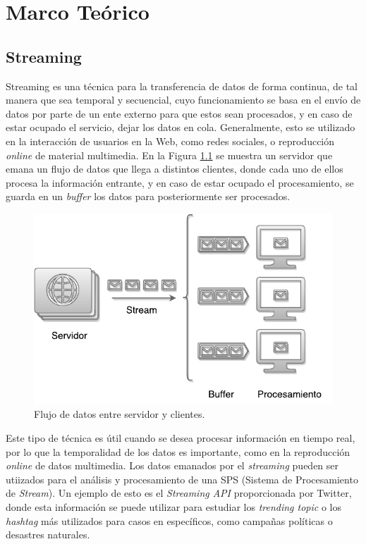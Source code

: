 \chapter{Marco Teórico}
\label{cap:marcoTeorico}

\section{Streaming}

Streaming es una técnica para la transferencia de datos de forma continua, de tal manera que sea temporal y secuencial, cuyo funcionamiento se basa en el envío de datos por parte de un ente externo para que estos sean procesados, y en caso de estar ocupado el servicio, dejar los datos en cola. Generalmente, esto se utilizado en la interacción de usuarios en la Web, como redes sociales, o reproducción \textit{online} de material multimedia. En la Figura \ref{fig:streaming} se muestra un servidor que emana un flujo de datos que llega a distintos clientes, donde cada uno de ellos procesa la información entrante, y en caso de estar ocupado el procesamiento, se guarda en un \textit{buffer} los datos para posteriormente ser procesados.

\begin{figure}[ht!]
  \centering
    \includegraphics[scale=0.7]{images/Streaming.pdf}
  \caption{Flujo de datos entre servidor y clientes.}
  \label{fig:streaming}
\end{figure}

Este tipo de técnica es útil cuando se desea procesar información en tiempo real, por lo que la temporalidad de los datos es importante, como en la reproducción \textit{online} de datos multimedia. Los datos emanados por el \textit{streaming} pueden ser utiizados para el análisis y procesamiento de una SPS (Sistema de Procesamiento de \textit{Stream}). Un ejemplo de esto es el \textit{Streaming API} proporcionada por Twitter, donde esta información se puede utilizar para estudiar los \textit{trending topic} o los \textit{hashtag} más utilizados para casos en específicos, como campañas políticas o desastres naturales. %

